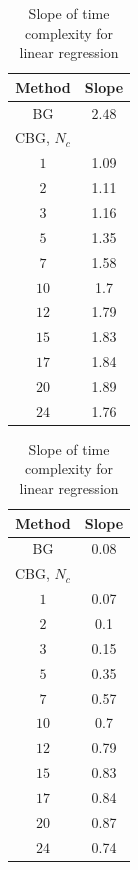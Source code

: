 \documentclass[11pt]{article}
\begin{document}
\begin{table}
  \caption{Slope of time complexity for linear regression}\label{tab:slope_time-complexity}
  \begin{center}
    \begin{tabular}[c]{|c|c|}
      \hline
      Method & Slope \\
      \hline
      BG & $2.48$ \\ \hline \hline
      CBG, $N_c$ &  \\ \hline
      $1$ & 1.09 \\ \hline
      $2$ & 1.11 \\ \hline
      $3$ & 1.16 \\ \hline
      $5$ & 1.35 \\ \hline
      $7$ & 1.58 \\ \hline
      $10$ & 1.7 \\ \hline
      $12$ & 1.79 \\ \hline
      $15$ & 1.83 \\ \hline
      $17$ & 1.84 \\ \hline
      $20$ & 1.89 \\ \hline
      $24$ & 1.76 \\ \hline
      \hline
    \end{tabular}
  \end{center}
\end{table}

\begin{table}
  \caption{Slope of time complexity for linear regression}\label{tab:slope_num_iteration}
  \begin{center}
    \begin{tabular}[c]{|c|c|}
      \hline
      Method & Slope \\
      \hline
      BG & $0.08$ \\ \hline \hline
      CBG, $N_c$ &  \\ \hline
      $1$ & 0.07 \\ \hline
      $2$ & 0.1 \\ \hline
      $3$ & 0.15 \\ \hline
      $5$ & 0.35 \\ \hline
      $7$ & 0.57 \\ \hline
      $10$ & 0.7 \\ \hline
      $12$ & 0.79 \\ \hline
      $15$ & 0.83 \\ \hline
      $17$ & 0.84 \\ \hline
      $20$ & 0.87 \\ \hline
      $24$ & 0.74 \\ \hline
      \hline
    \end{tabular}
  \end{center}
\end{table}
\end{document}

